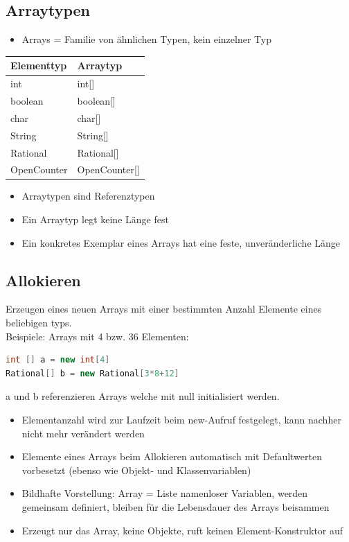 \subsection{Arraytypen}
\begin{itemize}
\item Arrays = Familie von ähnlichen Typen, kein einzelner Typ
\end{itemize}
\begin{tabular}{l|l}
Elementtyp & Arraytyp \\ \hline
int & int[] \\
boolean & boolean[]\\
char & char[]\\
String & String[]\\
Rational & Rational[] \\
OpenCounter & OpenCounter[] \\
\end{tabular}
\begin{itemize}
\item Arraytypen sind Referenztypen
\item Ein Arraytyp legt keine Länge fest
\item Ein konkretes Exemplar eines Arrays hat eine feste, unveränderliche Länge
\end{itemize}

\subsection{Allokieren}
Erzeugen eines neuen Arrays mit einer bestimmten Anzahl Elemente eines beliebigen typs. \\
Beispiele: Arrays mit 4 bzw. 36 Elementen:
 \begin{lstlisting}[language=JAVA]
int [] a = new int[4]
Rational[] b = new Rational[3*8+12]
\end{lstlisting}
a und b referenzieren Arrays welche mit null initialisiert werden. 
\begin{itemize} 
\item Elementanzahl wird zur Laufzeit beim new-Aufruf festgelegt, kann nachher nicht mehr verändert werden
\item Elemente eines Arrays beim Allokieren automatisch mit Defaultwerten vorbesetzt (ebenso wie Objekt- und Klassenvariablen)
\item Bildhafte Vorstellung: Array = Liste namenloser Variablen, werden gemeinsam definiert, bleiben für die Lebensdauer des Arrays beisammen
\item Erzeugt nur das Array, keine Objekte, ruft keinen Element-Konstruktor auf
\end{itemize}


